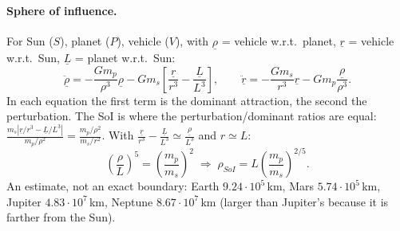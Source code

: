 \paragraph{Sphere of influence.} For Sun ($S$), planet ($P$), vehicle ($V$), with $\underline\rho$ = vehicle w.r.t.\ planet, $\underline r$ = vehicle w.r.t.\ Sun,
$\underline L$ = planet w.r.t.\ Sun:
\begin{equation}
\ddot{\underline\rho}=-\frac{Gm_p}{\rho^3}\underline\rho-Gm_s\left[\frac{\underline r}{r^3}-\frac{\underline L}{L^3}\right],\qquad
\ddot{\underline r}=-\frac{Gm_s}{r^3}\underline r-Gm_p\frac{\underline\rho}{\rho^3}.
\end{equation}
In each equation the first term is the dominant attraction, the second the perturbation. The SoI is where the perturbation/dominant ratios are
equal:
$\frac{m_s|\underline r/r^3-\underline L/L^3|}{m_p/\rho^2}=\frac{m_p/\rho^2}{m_s/r^2}$. With $\frac{\underline r}{r^3}-\frac{\underline L}{L^3}\simeq\frac{\underline\rho}{L^3}$ and $r\simeq L$:
\begin{equation}
\left(\frac{\rho}{L}\right)^{5}=\left(\frac{m_p}{m_s}\right)^2\;\Longrightarrow\;\rho_{SoI}=L\left(\frac{m_p}{m_s}\right)^{2/5}.
\end{equation}
An estimate, not an exact boundary: Earth $9.24\cdot10^5$\,km, Mars $5.74\cdot10^5$\,km, Jupiter $4.83\cdot10^7$\,km, Neptune $8.67\cdot10^7$\,km (larger
than Jupiter's because it is farther from the Sun).

